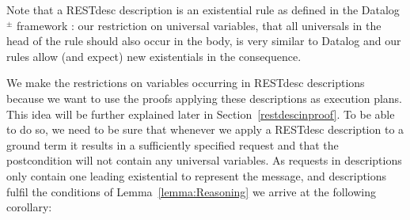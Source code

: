 Note that a RESTdesc description is an existential rule as defined in the Datalog$^{\pm}$ framework \cite{datalogpm}:
our restriction on universal variables,
that all universals in the head of the rule should also occur in the body,
is very similar to Datalog \cite{datalog}
and our rules 
 allow (and expect) new existentials in the consequence. 

We make the restrictions on variables occurring in RESTdesc descriptions because we want to use the proofs applying these descriptions as execution plans. 
This idea will 
be further explained later in Section~\ref{restdescinproof}.
To be able to do so, we need to be sure that whenever we apply a RESTdesc description to a ground term it results in a 
sufficiently specified \http request and that the postcondition will not contain any universal variables.
As \http requests in \restdesc descriptions only contain
one leading existential to represent the \http message, and 
\restdesc descriptions 
fulfil the conditions of Lemma~\ref{lemma:Reasoning}
we arrive at the following corollary:

